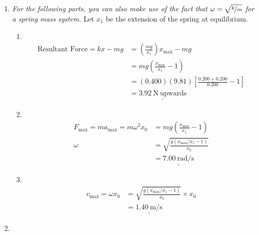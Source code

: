 \documentclass[11pt]{article}
\def\doubleunderline#1{\underline{\underline{#1}}}
\begin{document}
\begin{enumerate}[label={[D\arabic*]},itemsep={1em}]
\begin{enumerate}
				\vfill
				\item \textit{For the following parts, you can also make use of the fact that $\omega = \sqrt{\nicefrac{k}{m}}$ for a spring mass system.} Let $x_1$ be the extension of the spring at equilibrium.
					\begin{enumerate}
						\item \textcolor{white}{.}
							\vspace{-1.7\baselineskip}
							\begin{align*}
								\text{Resultant Force} = kx - mg &= \left(\frac{mg}{x_1}\right)x_\text{max} - mg \\
								&= mg\left(\frac{x_\text{max}}{x_1} - 1\right) \\
								&= \left(0.400\right)\left(9.81\right)\left[\frac{0.200 + 0.200}{0.200} - 1\right] \\
								&= \doubleunderline{\SI{3.92}{\newton}~\text{upwards}}
							\end{align*}
						\pagebreak[1]
						\item \textcolor{white}{.}
							\vspace{-2\baselineskip}
							\begin{align*}
								F_\text{max} = ma_\text{max} = m\omega^2x_0 &= mg\left(\frac{x_\text{max}}{x_1} - 1\right) \\
								\omega &= \sqrt{\frac{g\left(x_\text{max}/x_1-1\right)}{x_0}} \\
								&= \doubleunderline{\SI{7.00}{\radian\per\second}}
							\end{align*}
						\item \textcolor{white}{.}
							\vspace{-1.8\baselineskip}
							\begin{align*}
								v_\text{max} = \omega x_\text{0} &= \sqrt{\frac{g\left(x_\text{max}/x_1-1\right)}{x_0}} \times x_\text{0} \\
								&= \doubleunderline{\SI{1.40}{\meter\per\second}}
							\end{align*}
					\end{enumerate}
				\item \textcolor{white}{.}
					\begin{figure}[ht!]

\end{figure}
\end{enumerate}
\end{enumerate}
\end{document}
